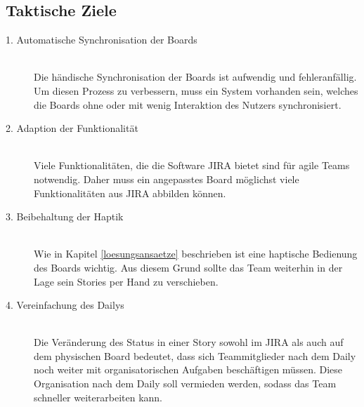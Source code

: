 \documentclass[12pt,titlepage]{scrartcl}
\begin{document}
		\subsection{Taktische Ziele} \label{taktisch}
		\begin{description}
 			\item[1. Automatische Synchronisation der Boards] \hfill \\
 			Die händische Synchronisation der Boards ist aufwendig und fehleranfällig. Um diesen Prozess zu verbessern, muss ein System vorhanden sein, welches die Boards ohne oder mit wenig Interaktion des Nutzers synchronisiert.
 			\item[2. Adaption der Funktionalität] \hfill \\
 			Viele Funktionalitäten, die die Software JIRA bietet sind für agile Teams notwendig. Daher muss ein angepasstes Board möglichst viele Funktionalitäten aus JIRA abbilden können.
 			\item[3. Beibehaltung der Haptik] \hfill \\
 			Wie in Kapitel \ref{loesungsansaetze} beschrieben ist eine haptische Bedienung des Boards wichtig. Aus diesem Grund sollte das Team weiterhin in der Lage sein Stories per Hand zu verschieben.
 			\item[4. Vereinfachung des Dailys] \hfill \\
 			Die Veränderung des Status in einer Story sowohl im JIRA als auch auf dem physischen Board bedeutet, dass sich Teammitglieder nach dem Daily noch weiter mit organisatorischen Aufgaben beschäftigen müssen. Diese Organisation nach dem Daily soll vermieden werden, sodass das Team schneller weiterarbeiten kann.
		\end{description}
\end{document}

